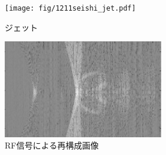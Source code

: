 \begin{figure}[H]
  \begin{center}
    \texttt{[image: fig/1211seishi\_jet.pdf]}
  \end{center}
  \caption{ジェット}
\end{figure}
\begin{figure}[H]
  \begin{center}
    \includegraphics[width=70mm]{fig/1211seishi.pdf}
  \end{center}
  \caption{RF信号による再構成画像}
\end{figure}